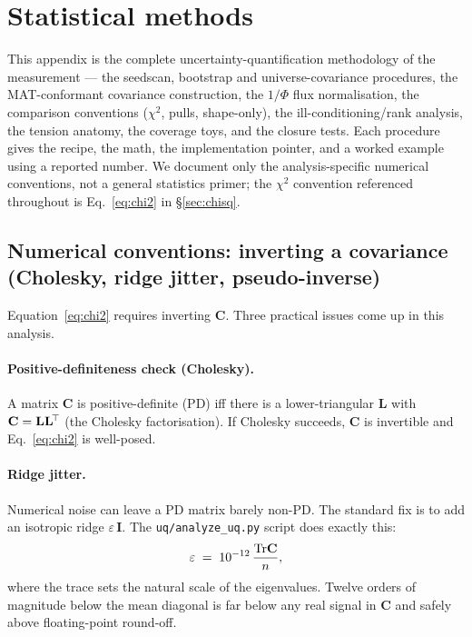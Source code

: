 \section{Statistical methods}
\label{app:statmethods}
\label{app:methods}

This appendix is the complete uncertainty-quantification methodology of the
measurement --- the seedscan, bootstrap and universe-covariance procedures,
the MAT-conformant covariance construction, the $1/\Phi$ flux normalisation,
the comparison conventions ($\chi^{2}$, pulls, shape-only), the
ill-conditioning/rank analysis, the tension anatomy, the coverage toys, and
the closure tests. Each procedure gives the recipe, the math, the
implementation pointer, and a worked example using a reported number. We
document only the analysis-specific numerical conventions, not a general
statistics primer; the $\chi^{2}$ convention referenced throughout is
Eq.~\eqref{eq:chi2} in \S\ref{sec:chisq}.


\subsection{Numerical conventions: inverting a covariance (Cholesky, ridge jitter, pseudo-inverse)}
\label{sec:invert}

Equation~\eqref{eq:chi2} requires inverting $\mathbf{C}$. Three
practical issues come up in this analysis.

\paragraph{Positive-definiteness check (Cholesky).}
A matrix $\mathbf{C}$ is positive-definite (PD) iff there is a
lower-triangular $\mathbf{L}$ with $\mathbf{C}=\mathbf{L}\mathbf{L}^{\!\top}$
(the Cholesky factorisation). If Cholesky succeeds, $\mathbf{C}$ is
invertible and Eq.~\eqref{eq:chi2} is well-posed.

\paragraph{Ridge jitter.}
Numerical noise can leave a PD matrix barely non-PD. The standard fix
is to add an isotropic ridge $\varepsilon\, \mathbf{I}$. The
\texttt{uq/analyze\_uq.py} script does exactly this:
\begin{equation}
\varepsilon \;=\; 10^{-12} \,\frac{\mathrm{Tr}\mathbf{C}}{n},
\end{equation}
where the trace sets the natural scale of the eigenvalues. Twelve
orders of magnitude below the mean diagonal is far below any real
signal in $\mathbf{C}$ and safely above floating-point round-off.

